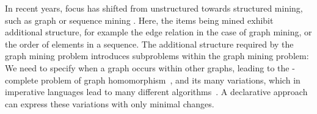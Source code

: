 In recent years, focus has shifted from unstructured towards structured mining, such as graph or sequence mining \citet{cp_sequence_mining,rennes_asp_sequences}.
Here, the items being mined exhibit additional structure, for example the edge relation in the case of graph mining, or the order of elements in a sequence.
The additional structure required by the graph mining problem introduces subproblems within the graph mining problem: We need to specify when a graph occurs within other graphs, leading to the \NP-complete problem of graph homomorphism~\citep{Lev73}, and its many variations, which in imperative languages lead to many different algorithms~\citep{gspan,theta_subsumption}.
A declarative approach can express these variations with only minimal changes.

